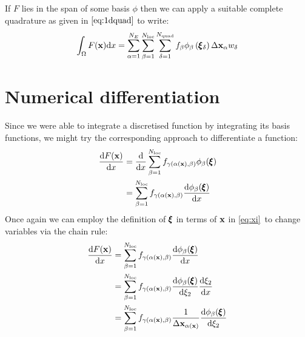 \documentclass[a4paper, 11pt]{book}
\begin{document}
If $F$ lies in the span of some basis $\phi$ then we can apply a suitable
complete quadrature as given in $\eqref{eq:1dquad}$ to write:
\begin{equation}
  \int_\Omega F(\mathbf{x})\mathrm{d} x = \sum_{\alpha=1}^{N_E}\sum_{\beta=1}^{N_\mathrm{loc}}
  \sum_{\delta=1}^{N_\mathrm{quad}} f_{\beta}
  \phi_{\beta}\left(\pmb{\xi}_\delta\right)\Delta\mathbf{x}_\alpha w_\delta
\end{equation}

\section{Numerical differentiation}

Since we were able to integrate a discretised function by integrating its
basis functions, we might try the corresponding approach to differentiate a
function:
\begin{equation}
  \begin{split}
    \frac{\mathrm{d} F(\mathbf{x})}{\mathrm{d} x}&=\frac{\mathrm{d}}{\mathrm{d} x}\sum_{\beta=1}^{N_\mathrm{loc}}
    f_{\gamma(\alpha(\mathbf{x}),\beta)}\phi_{\beta}(\pmb{\xi})\\
    &=\sum_{\beta=1}^{N_\mathrm{loc}}
    f_{\gamma(\alpha(\mathbf{x}),\beta)}\frac{\mathrm{d} \phi_{\beta}(\pmb{\xi})}{\mathrm{d} x}
  \end{split}
\end{equation}
Once again we can employ the definition of $\pmb{\xi}$ in terms of $\mathbf{x}$ in
\eqref{eq:xi}\ to change variables via the chain rule:
\begin{equation}\label{eq:1dpointdfdx}
  \begin{split}
    \frac{\mathrm{d} F(\mathbf{x})}{\mathrm{d} x}&=\sum_{\beta=1}^{N_\mathrm{loc}}
    f_{\gamma(\alpha(\mathbf{x}),\beta)}\frac{\mathrm{d} \phi_{\beta}(\pmb{\xi})}{\mathrm{d} x}\\
    &=\sum_{\beta=1}^{N_\mathrm{loc}}
    f_{\gamma(\alpha(\mathbf{x}),\beta)}\frac{\mathrm{d} \phi_{\beta}(\pmb{\xi})}{\mathrm{d} \xi_2}
    \frac{\mathrm{d}\xi_2}{\mathrm{d} x}\\
    &=\sum_{\beta=1}^{N_\mathrm{loc}}
    f_{\gamma(\alpha(\mathbf{x}),\beta)}\frac{1}{\Delta\mathbf{x}_{\alpha(\mathbf{x})}}\frac{\mathrm{d} \phi_{\beta}(\pmb{\xi})}{\mathrm{d} \xi_2}\\
  \end{split}
\end{equation}
\end{document}
